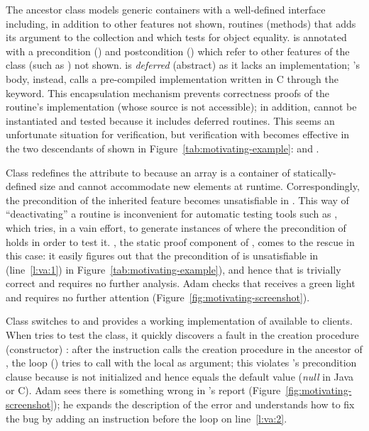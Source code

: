 The ancestor class  models generic containers with a well-defined interface including, in addition to other features not shown, routines (methods)  that adds its argument to the collection and  which tests for object equality.
 is annotated with a precondition () and postcondition () which refer to other features of the class (such as ) not shown.
 is \emph{deferred} (abstract) as it lacks an implementation; 's body, instead, calls a pre-compiled implementation written in C through the  keyword.
This encapsulation mechanism prevents correctness proofs of the routine's implementation (whose source is not accessible); in addition,  cannot be instantiated and tested because it includes deferred routines.
This seems an unfortunate situation for verification, but verification with \EVE becomes effective in the two descendants of  shown in Figure~\ref{tab:motivating-example}:  and .

Class  redefines the attribute  to  because an array is a container of statically-defined size and cannot accommodate new elements at runtime.
Correspondingly, the precondition of the inherited feature  becomes unsatisfiable in . This way of ``deactivating'' a routine is inconvenient for automatic testing tools such as \AutoTest, which tries, in a vain effort, to generate instances of  where the precondition of  holds in order to test it. \AutoProof, the static proof component of \EVE, comes to the rescue in this case: it easily figures out that the precondition of  is unsatisfiable in  (line~\ref{l:va:1}) in Figure~\ref{tab:motivating-example}), and hence that  is trivially correct and requires no further analysis.  Adam checks that  receives a green light and requires no further attention (Figure~\ref{fig:motivating-screenshot}).

Class  switches  to  and provides a working implementation of  available to clients. When \EVE tries to test the class, it quickly discovers a fault in the creation procedure (constructor) : after the instruction  calls the creation procedure in the ancestor of , the loop (\mbox{}) tries to call  with the local  as argument; this violates 's precondition clause  because  is not initialized and hence equals the default value  (\emph{null} in Java or C).
Adam sees there is something wrong in \EVE's report (Figure~\ref{fig:motivating-screenshot}); he expands the description of the error and understands how to fix the bug by adding an instruction  before the loop on line~\ref{l:va:2}.


